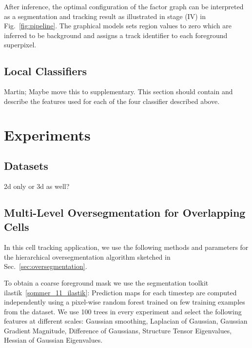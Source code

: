 \documentclass[10pt,twocolumn,letterpaper]{article}
\newcommand{\red}{\color{red}}
\begin{document}

After inference, the optimal configuration of the factor graph can be interpreted as a segmentation and tracking
result as illustrated in stage (IV) in Fig.~\ref{fig:pipeline}. The graphical models sets region values to zero which
are inferred to be background and assigns a track identifier to each foreground superpixel.


\subsection{Local Classifiers}
\label{sec:classifiers}

{\red Martin;
Maybe move this to supplementary. This section should contain and describe the features used for each of the four 
classifier described above.}

\section{Experiments}
\label{sec:experiments}


\subsection{Datasets}
\label{sec:datasets}
{\red 2d only or 3d as well?}

\subsection{Multi-Level Oversegmentation for Overlapping Cells}
\label{sec:oversegmentation_cells}

In this cell tracking application, we use the following methods and parameters for the 
hierarchical oversegmentation algorithm sketched in Sec.~\ref{sec:oversegmentation}. 

To obtain a coarse foreground mask we use the segmentation toolkit ilastik~\ref{sommer_11_ilastik}: 
Prediction maps for each timestep are computed independently using a pixel-wise random forest trained on 
few training examples from the dataset. We use 100 trees in every experiment and select the following features
at different scales: Gaussian smoothing, Laplacian of Gaussian, Gaussian Gradient Magnitude, Difference 
of Gaussians, Structure Tensor Eigenvalues, Hessian of Gaussian Eigenvalues.
\end{document}
